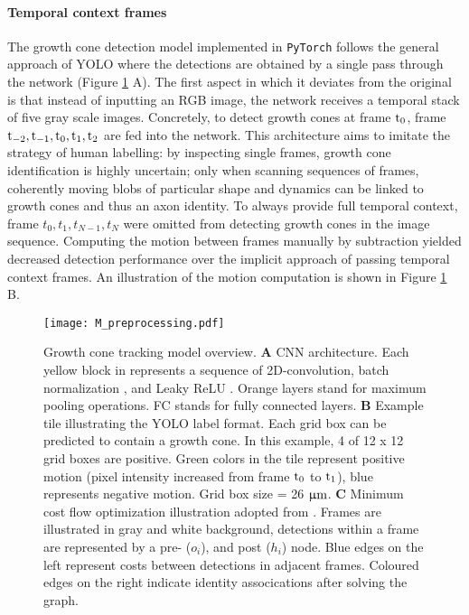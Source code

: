 \paragraph{Temporal context frames}
The growth cone detection model implemented in \verb|PyTorch| follows the
general approach of YOLO \parencite{yolo} where the detections are obtained by a
single pass through the network (Figure \ref{M_preprocessing} A). The first
aspect in which it deviates from the original is that instead of inputting an
RGB image, the network receives a temporal stack of five gray scale images.
Concretely, to detect growth cones at frame $\rm t_0$, frame $\rm t_{-2},
t_{-1}, t_{0}, t_{1}, t_{2}$ are fed into the network. This architecture aims to
imitate the strategy of human labelling: by inspecting single frames, growth
cone identification is highly uncertain; only when scanning sequences of frames,
coherently moving blobs of particular shape and dynamics can be linked to growth
cones and thus an axon identity. To always provide full temporal context, frame
$t_{0}, t_{1}, t_{N-1}, t_{N}$ were omitted from detecting growth cones in the
image sequence. Computing the motion between frames manually by subtraction
yielded decreased detection performance over the implicit approach of passing
temporal context frames. An illustration of the motion computation is shown in
Figure \ref{M_preprocessing} B.

\begin{figure}[h!]
    \texttt{[image: M\_preprocessing.pdf]}
    \caption[Growth cone tracking model overview]{Growth cone tracking model
             overview. \textbf{A} CNN architecture. Each yellow block in
             represents a sequence of 2D-convolution, batch normalization
             \parencite{BN}, and Leaky ReLU \parencite{leakyrelu}. Orange layers
             stand for maximum pooling operations. FC stands for fully connected
             layers. \textbf{B} Example tile illustrating the YOLO label format.
             Each grid box can be predicted to contain a growth cone. In this
             example, 4 of 12 x 12 grid boxes are positive. Green colors in the
             tile represent positive motion (pixel intensity increased from
             frame $\rm t_0$ to $\rm t_1$), blue represents negative motion.
             Grid box size = 26 $\rm \upmu m$. \textbf{C} Minimum cost flow
             optimization illustration adopted from \parencite{MCF}. Frames are
             illustrated in gray and white background, detections within a frame
             are represented by a pre- ($o_i$), and post ($h_i$) node. Blue
             edges on the left represent costs between detections in adjacent
             frames. Coloured edges on the right indicate identity assocications
             after solving the graph. 
             } 
    \label{M_preprocessing}
\end{figure}

